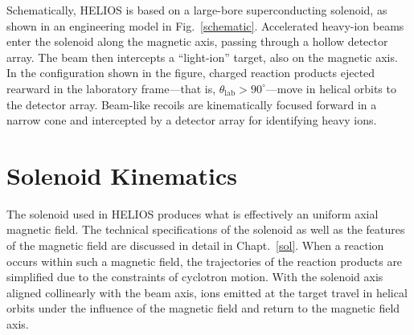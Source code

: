 Schematically, HELIOS is based on a large-bore superconducting solenoid, as shown in an engineering model in Fig.~\ref{schematic}.  Accelerated heavy-ion beams enter the solenoid along the magnetic axis, passing through a hollow detector array.  The beam then intercepts a ``light-ion'' target, also on the magnetic axis.  In the configuration shown in the figure, charged reaction products ejected rearward in the laboratory frame---that is, $\theta_\mathrm{lab}>90^\circ$---move in helical orbits to the detector array.  Beam-like recoils are kinematically focused forward in a narrow cone and intercepted by a detector array for identifying heavy ions.
\section{Solenoid Kinematics}
\label{solkin}
The solenoid used in HELIOS produces what is effectively an uniform axial magnetic field.  The technical specifications of the solenoid as well as the features of the magnetic field are discussed in detail in Chapt.~\ref{sol}.  When a reaction occurs within such a magnetic field, the trajectories of the reaction products are simplified due to the constraints of cyclotron motion.  With the solenoid axis aligned collinearly with the beam axis, ions emitted at the target travel in helical orbits under the influence of the magnetic field and return to the magnetic field axis.
